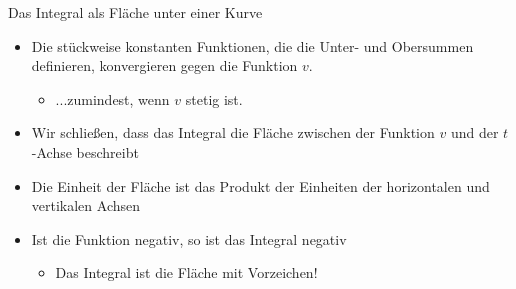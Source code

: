 \begin{frame}{Das Integral als Fläche unter einer Kurve}
    \begin{itemize}
        \item Die stückweise konstanten Funktionen, die die Unter- und Obersummen definieren, konvergieren gegen die Funktion $v$.
        \begin{itemize}
            \item ...zumindest, wenn $v$ stetig ist.
        \end{itemize}
        \item Wir schließen, dass das Integral die Fläche zwischen der Funktion $v$ und der $t$-Achse beschreibt
        \item Die Einheit der Fläche ist das Produkt der Einheiten der horizontalen und vertikalen Achsen
        \item<2-> Ist die Funktion negativ, so ist das Integral negativ
        \begin{itemize}
            \item Das Integral ist die Fläche mit Vorzeichen!
        \end{itemize}
    \end{itemize}
\end{frame}

